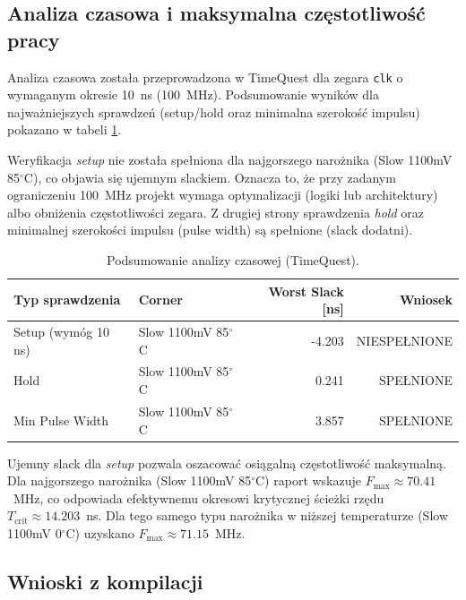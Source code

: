 \subsection{Analiza czasowa i maksymalna częstotliwość pracy}
\label{subsec:timing_analysis}

Analiza czasowa została przeprowadzona w TimeQuest dla zegara \texttt{clk} o wymaganym okresie 10~ns (100~MHz).
Podsumowanie wyników dla najważniejszych sprawdzeń (setup/hold oraz minimalna szerokość impulsu) pokazano w tabeli
\ref{tab:timing_summary}.

Weryfikacja \textit{setup} nie została spełniona dla najgorszego narożnika (Slow 1100mV 85$^\circ$C),
co objawia się ujemnym slackiem. Oznacza to, że przy zadanym ograniczeniu 100~MHz projekt wymaga optymalizacji
(logiki lub architektury) albo obniżenia częstotliwości zegara. Z drugiej strony sprawdzenia \textit{hold}
oraz minimalnej szerokości impulsu (pulse width) są spełnione (slack dodatni).

\begin{table}[!ht]
\centering
\caption{Podsumowanie analizy czasowej (TimeQuest).}
\label{tab:timing_summary}
\begin{tabular}{llrr}
\hline
Typ sprawdzenia & Corner & Worst Slack [ns] & Wniosek \\
\hline
Setup (wymóg 10 ns) & Slow 1100mV 85$^\circ$C & -4.203 & NIESPEŁNIONE \\
Hold & Slow 1100mV 85$^\circ$C & 0.241 & SPEŁNIONE \\
Min Pulse Width & Slow 1100mV 85$^\circ$C & 3.857 & SPEŁNIONE \\
\hline
\end{tabular}
\end{table}

Ujemny slack dla \textit{setup} pozwala oszacować osiągalną częstotliwość maksymalną.
Dla najgorszego narożnika (Slow 1100mV 85$^\circ$C) raport wskazuje $F_{\max}\approx 70.41$~MHz,
co odpowiada efektywnemu okresowi krytycznej ścieżki rzędu $T_{\mathrm{crit}}\approx 14.203$~ns.
Dla tego samego typu narożnika w niższej temperaturze (Slow 1100mV 0$^\circ$C) uzyskano
$F_{\max}\approx 71.15$~MHz.

\subsection{Wnioski z kompilacji}
\label{subsec:impl_conclusions}

